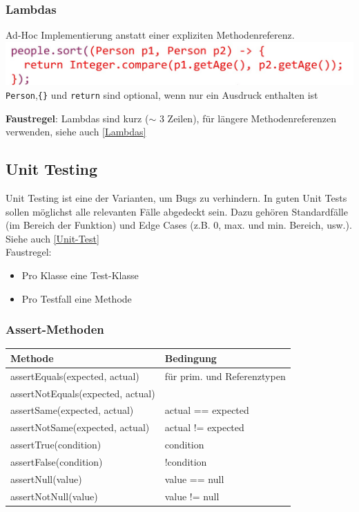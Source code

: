 \subsubsection{Lambdas}
Ad-Hoc Implementierung anstatt einer expliziten Methodenreferenz. \\
\includegraphics[width=\linewidth]{pictures/lambda.jpg}
\verb|Person|,\verb|{}| und \verb|return| sind optional, wenn nur ein Ausdruck enthalten ist

\textbf{Faustregel}: Lambdas sind kurz ($\sim$ 3 Zeilen), für längere Methodenreferenzen verwenden, siehe auch \ref{Lambdas}

\subsection{Unit Testing}
Unit Testing ist eine der Varianten, um Bugs zu verhindern. In guten Unit Tests sollen möglichst alle relevanten Fälle abgedeckt sein.
Dazu gehören Standardfälle (im Bereich der Funktion) und Edge Cases (z.B. 0, max. und min. Bereich, usw.). Siehe auch \ref{Unit-Test}\\
Faustregel:
\begin{itemize}
    \itemsep0em
    \item Pro Klasse eine Test-Klasse
    \item Pro Testfall eine Methode
\end{itemize}

\subsubsection{Assert-Methoden}
\begin{center}
    \begin{tabular}{ll}
        \rowcolor[RGB]{239,239,239} 
        \textbf{Methode} & \textbf{Bedingung} \\ \hline
        assertEquals(expected, actual) & für prim. und Referenztypen \\
        assertNotEquals(expected, actual) & \\
        assertSame(expected, actual) & actual == expected\\
        assertNotSame(expected, actual) & actual != expected\\
        assertTrue(condition) & condition\\
        assertFalse(condition) & !condition\\
        assertNull(value) & value == null\\
        assertNotNull(value) & value != null\\
    \end{tabular}
\end{center}

